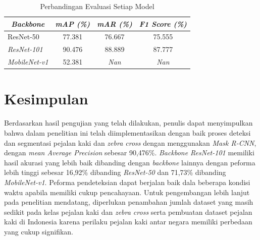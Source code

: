 \documentclass[conference]{IEEEtran}
\begin{document}
	\vspace{1ex}
	\begin{table}[h]
		\caption{Perbandingan Evaluasi Setiap Model}
		\centering
		\begin{tabular}{|l|c|c|c|}
			\hline
			\multicolumn{1}{|c|}{\textit{\textbf{Backbone}}} & \textit{\textbf{mAP (\%)}} & \textit{\textbf{mAR (\%)}} & \textit{\textbf{F1 Score (\%)}} \\ \hline
			ResNet-50                                        & 77.381                     & 76.667                         & 75.555                          \\ \hline
			\textit{ResNet-101}                              & 90.476                     & 88.889                     & 87.777                          \\ \hline
			\textit{MobileNet-v1}                            & 52.381                         & \textit{Nan}                        & \textit{Nan}                             \\ \hline
		\end{tabular}
		\label{tab:result}
	\end{table}
	
	\section{Kesimpulan}
	\vspace{1ex}
	Berdasarkan hasil pengujian yang telah dilakukan, penulis dapat menyimpulkan bahwa dalam penelitian ini telah diimplementasikan dengan baik proses deteksi dan segmentasi pejalan kaki dan \textit{zebra cross} dengan menggunakan \textit{Mask R-CNN}, dengan \textit{mean Average Precision} sebesar 90,476\%. \textit{Backbone ResNet-101} memiliki hasil akurasi yang lebih baik
	dibanding dengan \textit{backbone} lainnya dengan peforma lebih tinggi sebesar 16,92\% dibanding \textit{ResNet-50} dan 71,73\% dibanding \textit{MobileNet-v1}. Peforma pendeteksian dapat berjalan baik dala beberapa kondisi waktu apabila memiliki cukup pencahayaan. Untuk pengembangan lebih lanjut pada penelitian mendatang, diperlukan penambahan jumlah dataset yang masih sedikit pada kelas pejalan kaki dan \textit{zebra cross} serta pembuatan dataset pejalan kaki di Indonesia karena perilaku pejalan kaki antar negara memiliki perbedaan yang cukup
	signifikan.
	
	
	
\end{document}
